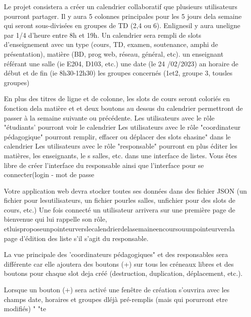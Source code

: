Le projet consistera a créer un calendrier collaboratif que plusieurs utilisateurs pourront partager. Il y aura 5 colonnes principales pour les 5 jours dela semaine qui seront sous-divisées en groupes de TD (2,4 ou 6).
Enlignesil y aura uneligne par 1/4 d'heure entre 8h et 19h. Un calendrier sera rempli de slots d'enseignement avec
un type (cours, TD, examen, soutenance, amphi de présentation), matière (BD, prog web, réseau, général, etc).
un enseignant référant
une salle (ie E204, D103, etc.) une date (le 24 /02/2023)
an horaire de début et de fin (ie 8h30-12h30)
les groupes concernés (1et2, groupe 3, tousles groupes)

En plus des titres de ligne et de
colonne, les slots de cours seront
coloriés en fonction dela matière et et deux boutons au dessus du calendrier
permettront de passer à la semaine
suivante ou précédente.
Les utilisateurs avec le rôle "étudiants' pourront voir le calendrier
Les utilisateurs avec le rôle
"coordinateur pédagogique" pourront remplir, effacer ou déplacer des slots
ehasine"
dans le calendrier
Les utilisateurs avec le rôle "responsable" pourront en plus éditer les matières, les enseignants, le s salles, etc. dans une interface de listes.
Vous êtes libre de créer l'interface du responsable ainsi que l'interface pour
se connecter(login - mot de passe


Votre application web devra stocker toutes ses données dans des fichier JSON (un fichier pour lesutilisateurs, un fichier pourles salles, unfichier pour des slots de cours, etc.)
Une fois connecté un utilisateur arrivera sur une première page de bienvenue qui lui rappelle son rôle, etluisproposeunpointeurverslecalendrierdelasemaineencoursouunpointeurversla
page d'édition des liste s'il s'agit du responsable.


La vue principale des 'coordinateurs pédagogiques" et des responsables sera différente car elle ajoutera des boutons
(+) sur tous les créneaux libres et des boutons pour
chaque slot deja créé (destruction, duplication,
déplacement, etc.).

Lorsque un bouton (+) sera activé une fenêtre de création s'ouvrira avec les champs date, horaires et groupes
dléjà pré-remplis (mais qui porurront etre modifiés)
" "te


